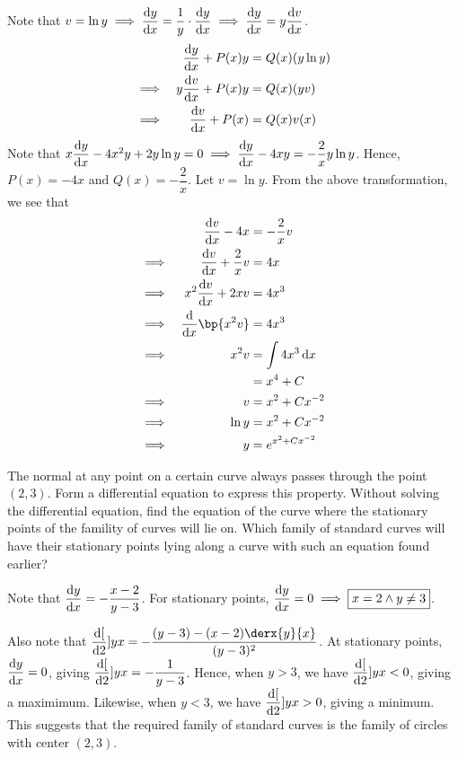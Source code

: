 \documentclass{echw}
\begin{document}
    \solution
        Note that $v = \ln y \implies \dfrac{\mathrm{d} y}{\mathrm{d} x} = \dfrac1y \cdot \dfrac{\mathrm{d} y}{\mathrm{d} x} \implies \dfrac{\mathrm{d} y}{\mathrm{d} x} = y \dfrac{\mathrm{d} v}{\mathrm{d} x}$.
        \begin{alignat*}{2}
            && \dfrac{\mathrm{d} y}{\mathrm{d} x} + P(x) y &= Q(x) (y \ln y)\\
            \implies&& y \dfrac{\mathrm{d} v}{\mathrm{d} x} + P(x) y &= Q(x) (y v)\\
            \implies&& \dfrac{\mathrm{d} v}{\mathrm{d} x} + P(x) &= Q(x) v(x)
        \end{alignat*}
        Note that $x \dfrac{\mathrm{d} y}{\mathrm{d} x} - 4x^2 y + 2y \ln y = 0 \implies \dfrac{\mathrm{d} y}{\mathrm{d} x} - 4x y = -\dfrac2x y \ln y$. Hence, $P(x) = -4x$ and $Q(x) = -\dfrac2x$. Let $v = \ln y$. From the above transformation, we see that
        \begin{alignat*}{2}
            &&\der{v}{x} - 4x &= -\dfrac2x v\\
            \implies&& \der{v}{x} + \dfrac2x v &= 4x\\
            \implies&& x^2 \der{v}{x} + 2x v &= 4x^3\\
            \implies&& \der{}{x} \bp{x^2 v} &= 4x^3\\
            \implies&& x^2 v &= \int 4x^3 \d x\\
            && &= x^4 + C\\
            \implies&& v &= x^2 + Cx^{-2}\\
            \implies&& \ln y &= x^2 + Cx^{-2}\\
            \implies&& y &= e^{x^2 + Cx^{-2}}
        \end{alignat*}

    \problem{}
        The normal at any point on a certain curve always passes through the point $(2, 3)$. Form a differential equation to express this property. Without solving the differential equation, find the equation of the curve where the stationary points of the famility of curves will lie on. Which family of standard curves will have their stationary points lying along a curve with such an equation found earlier?

    \solution
        Note that $\dfrac{\mathrm{d} y}{\mathrm{d} x} = -\dfrac{x-2}{y-3}$. For stationary points, $\dfrac{\mathrm{d} y}{\mathrm{d} x} = 0 \implies \boxed{x = 2 \land y \neq 3}$.
        
        Also note that $\der[2]{y}{x} = -\dfrac{(y-3) - (x-2)\derx{y}{x}}{(y-3)^2}$. At stationary points, $\dfrac{\mathrm{d} y}{\mathrm{d} x} = 0$, giving $\dfrac{\mathrm{d} [}{\mathrm{d} 2}]{y}{x} = -\dfrac1{y-3}$. Hence, when $y > 3$, we have $\dfrac{\mathrm{d} [}{\mathrm{d} 2}]{y}{x} < 0$, giving a maximimum. Likewise, when $y < 3$, we have $\dfrac{\mathrm{d} [}{\mathrm{d} 2}]{y}{x} > 0$, giving a minimum. This suggests that the required family of standard curves is the family of circles with center $(2, 3)$.
\end{document}
